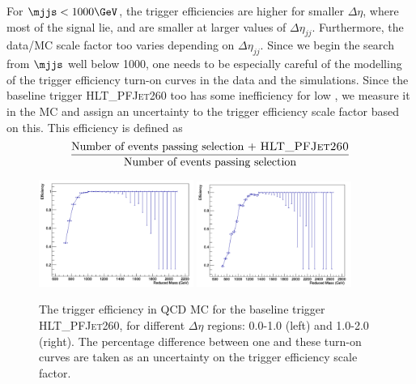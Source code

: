 For $\mjjs < 1000\GeV$, the trigger efficiencies are higher for smaller $\Delta\eta$, where most of the signal lie, and are smaller at larger values of $\Delta\eta_{jj}$. Furthermore, the data/MC scale factor too varies depending on $\Delta\eta_{jj}$. Since we begin the search from $\mjjs$ well below 1000\GeV, one needs to be especially careful of the modelling of the trigger efficiency turn-on curves in the data and the simulations. Since the baseline trigger \textsc{HLT\_PFJet260} too has some inefficiency for low \mjjs, we measure it in the MC and assign an uncertainty to the trigger efficiency scale factor based on this. This efficiency is defined as
\begin{equation}
\frac{\text{Number of events passing selection + \textsc{HLT\_PFJet260}}}{\text{Number of events passing selection}}
\end{equation}
\begin{figure}[h]
  \begin{center}  
    \includegraphics[width=0.45\textwidth]{F5/QCDDeta0v2.pdf} 
    \includegraphics[width=0.45\textwidth]{F5/QCDDeta1v2.pdf} 
  \end{center}
  \caption{The trigger efficiency in QCD MC for the baseline trigger \textsc{HLT\_PFJet260}, for different $\Delta\eta$ regions: 0.0-1.0 (left) and 1.0-2.0 (right).%
The percentage difference between one and these turn-on curves are taken as an uncertainty on the trigger efficiency scale factor.}
  \label{fig:trigeEffvsMjj_QCDHT_HLTPFJet260_DEtabins}
\end{figure}
